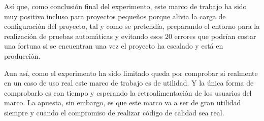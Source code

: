 Así que, como conclusión final del experimento, este marco de trabajo ha sido muy positivo incluso para proyectos pequeños porque alivia la carga de configuración del proyecto, tal y como se pretendía, preparando el entorno para la realización de pruebas automáticas y evitando esos 20 errores que podrían costar una fortuna si se encuentran una vez el proyecto ha escalado y está en producción.

Aun así, como el experimento ha sido limitado queda por comprobar si realmente en un caso de uso real este marco de trabajo es de utilidad. Y la única forma de comprobarlo es con tiempo y esperando la retroalimentación de los usuarios del marco. La apuesta, sin embargo, es que este marco va a ser de gran utilidad siempre y cuando el compromiso de realizar código de calidad sea real.
